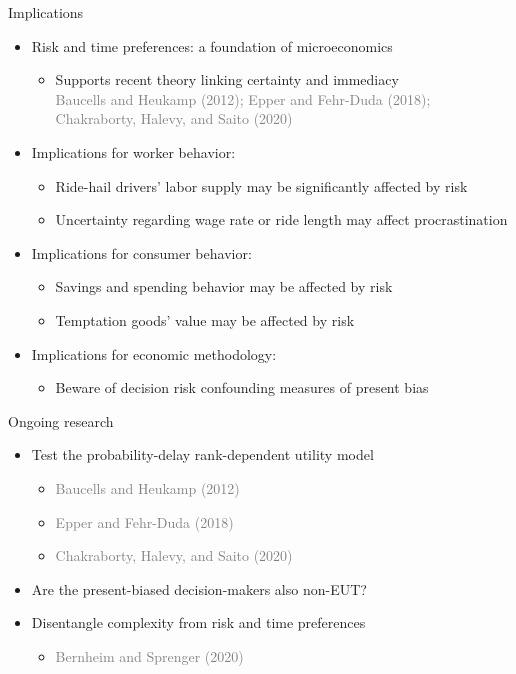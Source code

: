 \documentclass[professionalfont,10pt]{beamer}
\begin{document}
\begin{frame}{Implications}
\begin{itemize}[<+->]
\item Risk and time preferences: a foundation of microeconomics
\begin{itemize}[<+->]
\item Supports recent theory linking certainty and immediacy\\
\textcolor{gray}{Baucells and Heukamp (2012); Epper and Fehr-Duda (2018); Chakraborty, Halevy, and Saito (2020)}
\end{itemize}
\vspace{1\baselineskip}
\item Implications for worker behavior:
\begin{itemize}[<+->]
\item Ride-hail drivers' labor supply may be significantly affected by risk
\item Uncertainty regarding wage rate or ride length may affect procrastination
\end{itemize}
\vspace{1\baselineskip}
\item Implications for consumer behavior:
\begin{itemize}[<+->]
\item Savings and spending behavior may be affected by risk
\item Temptation goods' value may be affected by risk
\end{itemize}
\vspace{1\baselineskip}
\item Implications for economic methodology:
\begin{itemize}[<+->]
\item Beware of decision risk confounding measures of present bias
\end{itemize}
\end{itemize}
\end{frame}

\begin{frame}{Ongoing research}
\begin{itemize}[<+->]
\item Test the probability-delay rank-dependent utility model
\begin{itemize}
\item \textcolor{gray}{Baucells and Heukamp (2012)}
\item \textcolor{gray}{Epper and Fehr-Duda (2018)}
\item \textcolor{gray}{Chakraborty, Halevy, and Saito (2020) }
\end{itemize}
\vspace{1\baselineskip}
\item Are the present-biased decision-makers also non-EUT?
\vspace{1\baselineskip}
\item Disentangle complexity from risk and time preferences
\begin{itemize}
\item \textcolor{gray}{Bernheim and Sprenger (2020) }
\end{itemize}
\end{itemize}
\end{frame}
\end{document}
